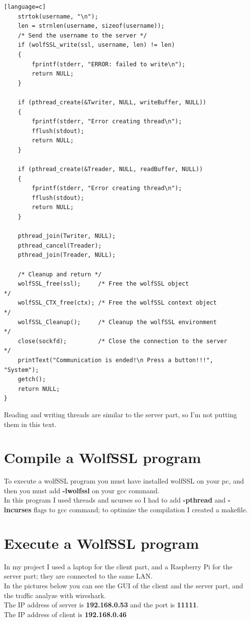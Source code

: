 \documentclass[a4paper,12pt]{report}
\begin{document}
\begin{lstlisting}[caption={void *client(void *args) of SSL client},captionpos=b][language=c]
    strtok(username, "\n");
    len = strnlen(username, sizeof(username));
    /* Send the username to the server */
    if (wolfSSL_write(ssl, username, len) != len)
    {
        fprintf(stderr, "ERROR: failed to write\n");
        return NULL;
    }

    if (pthread_create(&Twriter, NULL, writeBuffer, NULL))
    {
        fprintf(stderr, "Error creating thread\n");
        fflush(stdout);
        return NULL;
    }

    if (pthread_create(&Treader, NULL, readBuffer, NULL))
    {
        fprintf(stderr, "Error creating thread\n");
        fflush(stdout);
        return NULL;
    }

    pthread_join(Twriter, NULL);
    pthread_cancel(Treader);
    pthread_join(Treader, NULL);

    /* Cleanup and return */
    wolfSSL_free(ssl);     /* Free the wolfSSL object                  */
    wolfSSL_CTX_free(ctx); /* Free the wolfSSL context object          */
    wolfSSL_Cleanup();     /* Cleanup the wolfSSL environment          */
    close(sockfd);         /* Close the connection to the server       */
    printText("Communication is ended!\n Press a button!!!", "System");
    getch();
    return NULL;
}
\end{lstlisting}

Reading and writing threads are similar to the server part, so I'm not putting them in this text.

\section{Compile a WolfSSL program}
To execute a wolfSSL program you must have installed wolfSSL on your pc, and then you must add \textbf{-lwolfssl} on your gcc command.
\\In this program I used threads and ncurses so I had to add \textbf{-pthread} and \textbf{-lncurses} flags to gcc command; to optimize the compilation I created a makefile.

\section{Execute a WolfSSL program}
In my project I used a laptop for the client part, and a Raspberry Pi for the server part; they are connected to the same LAN.
\\In the pictures below you can see the GUI of the client and the server part, and the traffic analyze with wireshark.
\\The IP address of server is \textbf{192.168.0.53} and the port is \textbf{11111}.
\\The IP address of client is \textbf{192.168.0.46}\\
\end{document}
